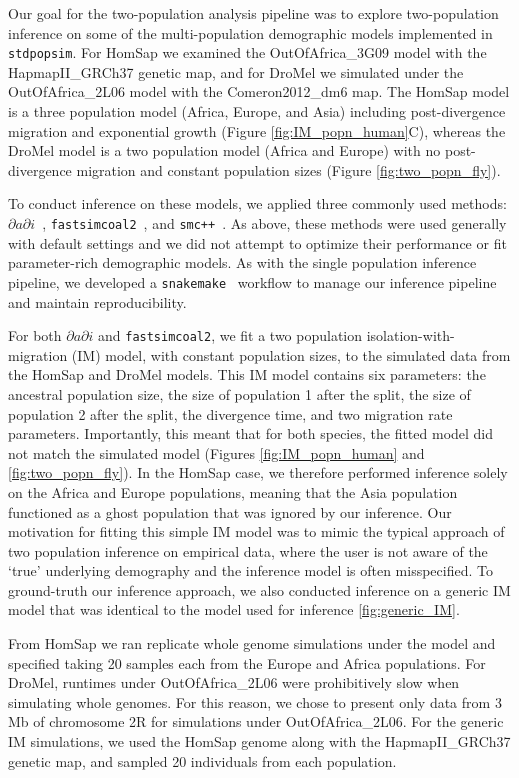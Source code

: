 \documentclass[12pt,halfline,a4paper]{ouparticle}
\newcommand{\stdpopsim}{\texttt{stdpopsim}\xspace}
\newcommand{\dadi}{$\partial a \partial i$\xspace}
\newcommand{\smcpp}{\texttt{smc++}\xspace}
\newcommand{\fastsimcoal}{\texttt{fastsimcoal2}\xspace}
\begin{document}
Our goal for the two-population analysis pipeline was to explore two-population inference
on some of the multi-population demographic models implemented in \stdpopsim.
For HomSap we examined the OutOfAfrica\_3G09 model with the HapmapII\_GRCh37 genetic map,
and for DroMel we simulated under the OutOfAfrica\_2L06 model with the Comeron2012\_dm6 map.
The HomSap model is a three population model (Africa, Europe, and Asia) including post-divergence
migration and exponential growth (Figure \ref{fig:IM_popn_human}C), whereas the
DroMel model is a two population model (Africa and Europe) with no post-divergence
migration and constant population sizes (Figure \ref{fig:two_popn_fly}).

To conduct inference on these models, we applied three commonly used methods:
\dadi~\citep{gutenkunst2009inferring}, \fastsimcoal~\citep{excoffier2013robust},
and \smcpp~\citep{terhorst2017robust}. As above, these methods were used
generally with default settings and we did not attempt to optimize their performance or fit
parameter-rich demographic models. As with the single population inference pipeline,
we developed a \texttt{snakemake}~\citep{koster2012snakemake} workflow to manage
our inference pipeline and maintain reproducibility.

For both \dadi and \fastsimcoal, we fit a two population
isolation-with-migration (IM) model, with constant population sizes, to the simulated
data from the HomSap and DroMel models. This IM model contains six parameters:
the ancestral population size, the size of population 1 after the split, the size of
population 2 after the split, the divergence time, and two migration rate parameters.
Importantly, this meant that for both species, the
fitted model did not match the simulated model (Figures \ref{fig:IM_popn_human} and \ref{fig:two_popn_fly}).
In the HomSap case, we therefore performed inference solely on the Africa
and Europe populations, meaning that the Asia population functioned as a ghost
population that was ignored by our inference. Our motivation for fitting this simple
IM model was to mimic the typical approach of two population inference on empirical
data, where the user is not aware of the `true' underlying demography and the inference
model is often misspecified. To ground-truth our inference approach, we also conducted
inference on a generic IM model that was identical to the model used for inference \ref{fig:generic_IM}.

From HomSap we ran replicate whole genome simulations under the model
and specified taking 20 samples each from the Europe and Africa populations.
For DroMel, runtimes under OutOfAfrica\_2L06 were prohibitively slow when simulating whole genomes.
For this reason, we chose to present only data from 3 Mb of chromosome 2R for simulations
under OutOfAfrica\_2L06.
For the generic IM simulations, we used the HomSap genome along with the
HapmapII\_GRCh37 genetic map, and sampled 20 individuals from each population.
\end{document}
